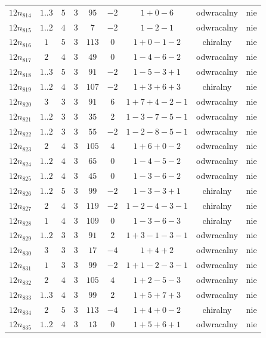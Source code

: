 \begin{longtable}{ccccccccc}
$12n_{814}$ & $1..3$ & $5$ & $3$ & $95$ & $-2$ & $1+0-6$ & odwracalny & nie \\
$12n_{815}$ & $1..2$ & $4$ & $3$ & $7$ & $-2$ & $1-2-1$ & odwracalny & nie \\
$12n_{816}$ & $1$ & $5$ & $3$ & $113$ & $0$ & $1+0-1-2$ & chiralny & nie \\
$12n_{817}$ & $2$ & $4$ & $3$ & $49$ & $0$ & $1-4-6-2$ & odwracalny & nie \\
$12n_{818}$ & $1..3$ & $5$ & $3$ & $91$ & $-2$ & $1-5-3+1$ & odwracalny & nie \\
$12n_{819}$ & $1..2$ & $4$ & $3$ & $107$ & $-2$ & $1+3+6+3$ & chiralny & nie \\
$12n_{820}$ & $3$ & $3$ & $3$ & $91$ & $6$ & $1+7+4-2-1$ & odwracalny & nie \\
$12n_{821}$ & $1..2$ & $3$ & $3$ & $35$ & $2$ & $1-3-7-5-1$ & odwracalny & nie \\
$12n_{822}$ & $1..2$ & $3$ & $3$ & $55$ & $-2$ & $1-2-8-5-1$ & odwracalny & nie \\
$12n_{823}$ & $2$ & $4$ & $3$ & $105$ & $4$ & $1+6+0-2$ & odwracalny & nie \\
$12n_{824}$ & $1..2$ & $4$ & $3$ & $65$ & $0$ & $1-4-5-2$ & odwracalny & nie \\
$12n_{825}$ & $1..2$ & $4$ & $3$ & $45$ & $0$ & $1-3-6-2$ & odwracalny & nie \\
$12n_{826}$ & $1..2$ & $5$ & $3$ & $99$ & $-2$ & $1-3-3+1$ & chiralny & nie \\
$12n_{827}$ & $2$ & $4$ & $3$ & $119$ & $-2$ & $1-2-4-3-1$ & chiralny & nie \\
$12n_{828}$ & $1$ & $4$ & $3$ & $109$ & $0$ & $1-3-6-3$ & chiralny & nie \\
$12n_{829}$ & $1..2$ & $3$ & $3$ & $91$ & $2$ & $1+3-1-3-1$ & odwracalny & nie \\
$12n_{830}$ & $3$ & $3$ & $3$ & $17$ & $-4$ & $1+4+2$ & odwracalny & nie \\
$12n_{831}$ & $1$ & $3$ & $3$ & $99$ & $-2$ & $1+1-2-3-1$ & odwracalny & nie \\
$12n_{832}$ & $2$ & $4$ & $3$ & $105$ & $4$ & $1+2-5-3$ & odwracalny & nie \\
$12n_{833}$ & $1..3$ & $4$ & $3$ & $99$ & $2$ & $1+5+7+3$ & odwracalny & nie \\
$12n_{834}$ & $2$ & $5$ & $3$ & $113$ & $-4$ & $1+4+0-2$ & chiralny & nie \\
$12n_{835}$ & $1..2$ & $4$ & $3$ & $13$ & $0$ & $1+5+6+1$ & odwracalny & nie \\

\end{longtable}
